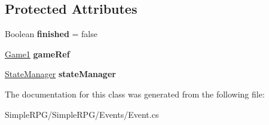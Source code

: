 \subsection*{Protected Attributes}
\begin{DoxyCompactItemize}
\item 
\hypertarget{class_simple_r_p_g_1_1_events_1_1_event_af9e2be9b16bc904e3276ed114a4d11a5}{Boolean {\bfseries finished} = false}\label{class_simple_r_p_g_1_1_events_1_1_event_af9e2be9b16bc904e3276ed114a4d11a5}

\item 
\hypertarget{class_simple_r_p_g_1_1_events_1_1_event_a60fe4373065c00d225e11f24c785197c}{\hyperlink{class_simple_r_p_g_1_1_game1}{Game1} {\bfseries game\-Ref}}\label{class_simple_r_p_g_1_1_events_1_1_event_a60fe4373065c00d225e11f24c785197c}

\item 
\hypertarget{class_simple_r_p_g_1_1_events_1_1_event_a08f23edd033e042324051522a1533c84}{\hyperlink{class_simple_r_p_g_1_1_states_1_1_state_manager}{State\-Manager} {\bfseries state\-Manager}}\label{class_simple_r_p_g_1_1_events_1_1_event_a08f23edd033e042324051522a1533c84}

\end{DoxyCompactItemize}


The documentation for this class was generated from the following file\-:\begin{DoxyCompactItemize}
\item 
Simple\-R\-P\-G/\-Simple\-R\-P\-G/\-Events/Event.\-cs\end{DoxyCompactItemize}
